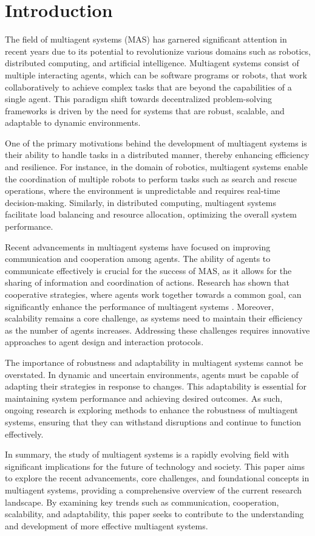 \section{Introduction}

The field of multiagent systems (MAS) has garnered significant attention in recent years due to its potential to revolutionize various domains such as robotics, distributed computing, and artificial intelligence. Multiagent systems consist of multiple interacting agents, which can be software programs or robots, that work collaboratively to achieve complex tasks that are beyond the capabilities of a single agent. This paradigm shift towards decentralized problem-solving frameworks is driven by the need for systems that are robust, scalable, and adaptable to dynamic environments.

One of the primary motivations behind the development of multiagent systems is their ability to handle tasks in a distributed manner, thereby enhancing efficiency and resilience. For instance, in the domain of robotics, multiagent systems enable the coordination of multiple robots to perform tasks such as search and rescue operations, where the environment is unpredictable and requires real-time decision-making. Similarly, in distributed computing, multiagent systems facilitate load balancing and resource allocation, optimizing the overall system performance.

Recent advancements in multiagent systems have focused on improving communication and cooperation among agents. The ability of agents to communicate effectively is crucial for the success of MAS, as it allows for the sharing of information and coordination of actions. Research has shown that cooperative strategies, where agents work together towards a common goal, can significantly enhance the performance of multiagent systems \cite{cooperative_ai}. Moreover, scalability remains a core challenge, as systems need to maintain their efficiency as the number of agents increases. Addressing these challenges requires innovative approaches to agent design and interaction protocols.

The importance of robustness and adaptability in multiagent systems cannot be overstated. In dynamic and uncertain environments, agents must be capable of adapting their strategies in response to changes. This adaptability is essential for maintaining system performance and achieving desired outcomes. As such, ongoing research is exploring methods to enhance the robustness of multiagent systems, ensuring that they can withstand disruptions and continue to function effectively.

In summary, the study of multiagent systems is a rapidly evolving field with significant implications for the future of technology and society. This paper aims to explore the recent advancements, core challenges, and foundational concepts in multiagent systems, providing a comprehensive overview of the current research landscape. By examining key trends such as communication, cooperation, scalability, and adaptability, this paper seeks to contribute to the understanding and development of more effective multiagent systems.
